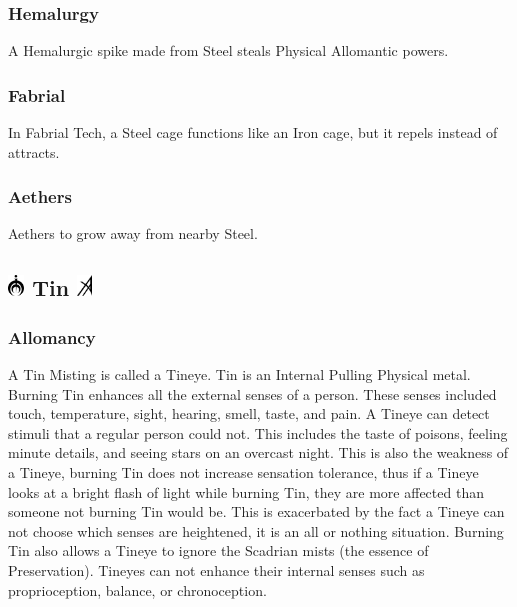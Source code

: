 \documentclass[conference]{IEEEtran}
\newcommand{\n}{\hfill\break}
\begin{document}
\subsubsection*{\textbf{Hemalurgy}}
A Hemalurgic spike made from Steel steals Physical Allomantic powers.\cite{HE-TB}\\
\subsubsection*{\textbf{Fabrial}}
In Fabrial Tech, a Steel cage functions like an Iron cage, but it repels instead of attracts.\cite{RoW-E11}\n
\subsubsection*{\textbf{Aethers}}
Aethers to grow away from nearby Steel.\cite{ToES-CH26}
\newpage
\subsection*{\includegraphics[height=1em]{images/Tin.png}  \textbf{Tin} \includegraphics[height=1em]{images/Tin_(Feruchemy).png}}
\subsubsection*{\textbf{Allomancy}}
A Tin Misting is called a Tineye.\cite{ARS}  Tin is an Internal Pulling Physical metal.  Burning Tin enhances all the external senses of a person.\cite{AL-TB}  These senses included touch, temperature, sight, hearing, smell, taste, and pain.\cite{ARS}  A Tineye can detect stimuli that a regular person could not.  This includes the taste of poisons,\cite{WoA-CH18} feeling minute details, and seeing stars on an overcast night.\cite{TFE-CH7}  This is also the weakness of a Tineye, burning Tin does not increase sensation tolerance, thus if a Tineye looks at a bright flash of light while burning Tin,\cite{TFE-CH7} they are more affected than someone not burning Tin would be.  This is exacerbated by the fact a Tineye can not choose which senses are heightened,\cite{TFE-CH32} it is an all or nothing situation.  Burning Tin also allows a Tineye to ignore the Scadrian mists\cite{TFE-CH7} (the essence of Preservation\cite{HoA-CH75}).  Tineyes can not enhance their internal senses such as proprioception, balance, or chronoception.\cite{HoA-CH41}\\
\end{document}
